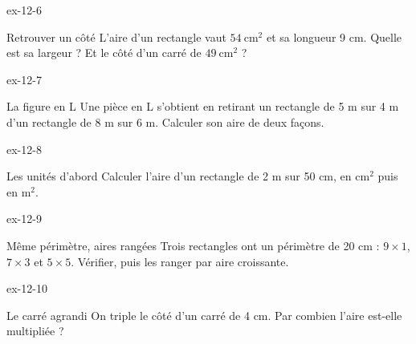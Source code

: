 \begin{blocLivre}{ex-12-6}\begin{exercice}[2]{Retrouver un côté}
L’aire d’un rectangle vaut $54\ \mathrm{cm}^2$ et sa longueur 9 cm. Quelle est sa largeur ? Et le côté d’un carré de $49\ \mathrm{cm}^2$ ?
\end{exercice}\end{blocLivre}
\begin{blocLivre}{ex-12-7}\begin{exercice}[2]{La figure en L}
Une pièce en L s’obtient en retirant un rectangle de 5 m sur 4 m d’un rectangle de 8 m sur 6 m. Calculer son aire de deux façons.
\label{fig-ex-12-7}
\end{exercice}\end{blocLivre}
\begin{blocLivre}{ex-12-8}\begin{exercice}[2]{Les unités d’abord}
Calculer l’aire d’un rectangle de 2 m sur 50 cm, en $\mathrm{cm}^2$ puis en $\mathrm m^2$.
\end{exercice}\end{blocLivre}
\begin{blocLivre}{ex-12-9}\begin{exercice}[2]{Même périmètre, aires rangées}
Trois rectangles ont un périmètre de 20 cm : $9\times1$, $7\times3$ et $5\times5$. Vérifier, puis les ranger par aire croissante.
\end{exercice}\end{blocLivre}
\begin{blocLivre}{ex-12-10}\begin{exercice}[2]{Le carré agrandi}
On triple le côté d’un carré de 4 cm. Par combien l’aire est-elle multipliée ?
\end{exercice}\end{blocLivre}

